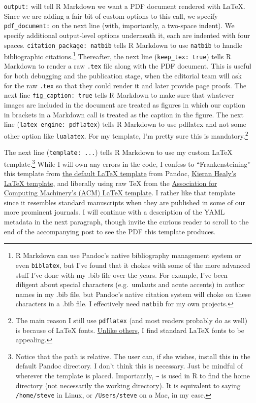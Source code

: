 \documentclass[10pt,a4paper]{article}
\begin{document}
\texttt{output:} will tell R Markdown we want a PDF document rendered
with LaTeX. Since we are adding a fair bit of custom options to this
call, we specify \texttt{pdf\_document:} on the next line (with,
importantly, a two-space indent). We specify additional output-level
options underneath it, each are indented with four spaces.
\texttt{citation\_package:\ natbib} tells R Markdown to use
\texttt{natbib} to handle bibliographic citations.\footnote{R Markdown
  can use Pandoc's native bibliography management system or even
  \texttt{biblatex}, but I've found that it chokes with some of the more
  advanced stuff I've done with my .bib file over the years. For
  example, I've been diligent about special characters (e.g.~umlauts and
  acute accents) in author names in my .bib file, but Pandoc's native
  citation system will choke on these characters in a .bib file. I
  effectively need \texttt{natbib} for my own projects.} Thereafter, the
next line (\texttt{keep\_tex:\ true}) tells R Markdown to render a raw
\texttt{.tex} file along with the PDF document. This is useful for both
debugging and the publication stage, when the editorial team will ask
for the raw \texttt{.tex} so that they could render it and later provide
page proofs. The next line \texttt{fig\_caption:\ true} tells R Markdown
to make sure that whatever images are included in the document are
treated as figures in which our caption in brackets in a Markdown call
is treated as the caption in the figure. The next line
(\texttt{latex\_engine:\ pdflatex}) tells R Markdown to use pdflatex and
not some other option like \texttt{lualatex}. For my template, I'm
pretty sure this is mandatory.\footnote{The main reason I still use
  \texttt{pdflatex} (and most readers probably do as well) is because of
  LaTeX fonts.
  \href{http://www-rohan.sdsu.edu/~aty/bibliog/latex/gripe.html}{Unlike
  others}, I find standard LaTeX fonts to be appealing.}

The next line (\texttt{template:\ ...}) tells R Markdown to use my
custom LaTeX template.\footnote{Notice that the path is relative. The
  user can, if she wishes, install this in the default Pandoc directory.
  I don't think this is necessary. Just be mindful of wherever the
  template is placed. Importantly, \texttt{\textasciitilde{}} is used in
  R to find the home directory (not necessarily the working directory).
  It is equivalent to saying \texttt{/home/steve} in Linux, or
  \texttt{/Users/steve} on a Mac, in my case.} While I will own any
errors in the code, I confess to ``Frankensteining'' this template from
\href{https://github.com/jgm/pandoc-templates}{the default LaTeX
template} from Pandoc,
\href{https://github.com/kjhealy/pandoc-templates/tree/master/templates}{Kieran
Healy's LaTeX template}, and liberally using raw TeX from the
\href{https://www.acm.org/publications/article-templates/acm-latex-style-guide}{Association
for Computing Machinery's (ACM) LaTeX template}. I rather like that
template since it resembles standard manuscripts when they are published
in some of our more prominent journals. I will continue with a
description of the YAML metadata in the next paragraph, though invite
the curious reader to scroll to the end of the accompanying post to see
the PDF this template produces.
\end{document}
